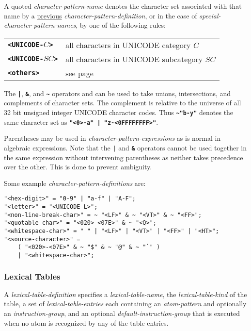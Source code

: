 \documentclass[12pt]{article}
\newcommand{\TT}[1]{{\tt \bfseries #1}}
\newenvironment{indpar}[1][0.3in]%
	{\begin{list}{}%
		     {\setlength{\itemsep}{0in}%
		      \setlength{\topsep}{0in}%
		      \setlength{\parsep}{1ex}%
		      \setlength{\labelwidth}{#1}%
		      \setlength{\leftmargin}{#1}%
		      \addtolength{\leftmargin}{\labelsep}}%
	 \item}%
	{\end{list}}
\begin{document}
A quoted {\em character-pattern-name} denotes the character set associated
with that name by a \underline{previous} {\em character-pattern-definition},
or in the case of {\em special-character-pattern-names}, by one of the
following rules:
\begin{center}
\begin{tabular}{ll}
\TT{<UNICODE-$C$>} & all characters in UNICODE category $C$ \\
\TT{<UNICODE-$SC$>} & all characters in UNICODE subcategory $SC$ \\
\TT{<others>} & see page \pageref{<OTHERS>} \\
\end{tabular}
\end{center}

The \TT{|}, \TT{\&}, and \TT{\textasciitilde} operators and can be used to take
unions, intersections, and complements of character sets.  The complement
is relative to the universe of all 32 bit unsigned integer UNICODE
character codes.  Thus \TT{\textasciitilde "b-y"}
denotes the same character set as
\TT{"<0>-a"\,|\,"z-<0FFFFFFFF>"}.

Parentheses may be used in {\em character-pattern-expressions} as is
normal in algebraic expressions.
Note that the \TT{|} and \TT{\&} operators cannot be used together
in the same expression without intervening parentheses as neither
takes precedence over the other.  This is done to prevent ambiguity.

Some example {\em character-pattern-definitions} are:

\begin{indpar}[0.05in]\begin{verbatim}
"<hex-digit>" = "0-9" | "a-f" | "A-F";
"<letter>" = "<UNICODE-L>";
"<non-line-break-char>" = ~ "<LF>" & ~ "<VT>" & ~ "<FF>";
"<quotable-char>" = "<020>-<07E>" & ~ "<Q>";
"<whitespace-char>" = " " | "<LF>" | "<VT>" | "<FF>" | "<HT>";
"<source-character>" =
    ( "<020>-<07E>" & ~ "$" & ~ "@" & ~ "`" )
    | "<whitespace-char>";
\end{verbatim}\end{indpar}

\subsubsection{Lexical Tables}

A {\em lexical-table-definition} specifies a {\em lexical-table-name},
the {\em lexical-table-kind} of the table,
a set of {\em lexical-table-entries}
each containing an {\em atom-pattern} and optionally
an {\em instruction-group},
and an optional {\em default-instruction-group} that is executed when
no atom is recognized by any of the table entries.
\end{document}
